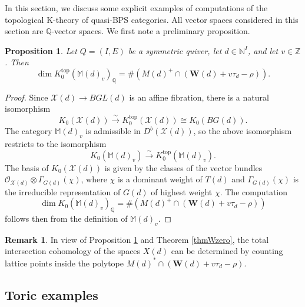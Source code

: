 \documentclass [11pt,oneside,a4paper,mathscr]{amsart}
\newtheorem{prop}[thm]{Proposition}
\theoremstyle{definition}
\newtheorem{remark}[thm]{Remark}
\newcommand{\X}{\mathscr{X}}
\begin{document}
In this section, we discuss some explicit examples of computations of the topological K-theory of quasi-BPS categories. All vector spaces considered in this section are $\mathbb{Q}$-vector spaces.
We first note a preliminary proposition.

\begin{prop}\label{prop81}
    Let $Q=(I,E)$ be a symmetric quiver, let $d\in \mathbb{N}^I$, and let $v\in\mathbb{Z}$. Then
    \[\dim K^{\mathrm{top}}_0(\mathbb{M}(d)_v)_{\mathbb{Q}}=\# \left(M(d)^+\cap (\mathbf{W}(d)+v\tau_d-\rho)\right).\]
\end{prop}

\begin{proof}
Since $\X(d) \to BGL(d)$ is an affine fibration, 
there is a natural isomorphism \[K_0(\X(d))\xrightarrow{\sim} K_0^{\mathrm{top}}(\X(d))\cong K_0(BG(d)).\] The category $\mathbb{M}(d)_v$ is admissible in $D^b(\X(d))$, so the above isomorphism restricts 
    to the isomorphism \[K_0(\mathbb{M}(d)_v)\xrightarrow{\sim} K_0^{\mathrm{top}}(\mathbb{M}(d)_v).\] The basis of $K_0(\X(d))$ is given by
    the classes of the vector bundles $\mathcal{O}_{\X(d)}\otimes \Gamma_{G(d)}(\chi)$, where $\chi$ is a dominant weight of $T(d)$ and $\Gamma_{G(d)}(\chi)$ is the irreducible representation of $G(d)$ of highest weight $\chi$. The computation \[\dim K_0(\mathbb{M}(d)_v)_{\mathbb{Q}}=\# \left(M(d)^+\cap (\textbf{W}(d)+v\tau_d-\rho)\right)\] follows then from the definition of $\mathbb{M}(d)_v$.
\end{proof}

\begin{remark}\label{remarksub8}
  In view of Proposition \ref{prop81} and  Theorem \ref{thmWzero}, the total intersection cohomology of the spaces $X(d)$ can be determined by counting lattice points inside the polytope $M(d)^*\cap(\textbf{W}(d)+v\tau_d-\rho)$. 
\end{remark}



\subsection{Toric examples}
\end{document}
